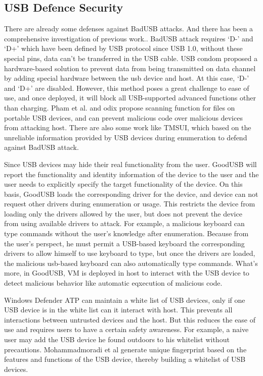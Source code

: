 \subsection{USB Defence Security}
There are already some defenses against BadUSB attacks. 
And there has been a comprehensive investigation of previous work.\cite{sok}.
BadUSB attack requires `D-' and `D+' which have been defined by USB protocol since USB 1.0\cite{usb10},
without these special pins, data can't be transferred in the USB cable. USB condom \cite{Condom} proposed a hardware-based solution to prevent data from being transmitted on data channel by adding special hardware between the usb device and host. At this case, `D-' and `D+' are disabled.
However, this method poses a great challenge to ease of use, and once deployed, it will block all USB-supported advanced functions other than charging. Pham et al. \cite{pham2010optimizing} and odix\cite{OLEA} propose scanning function for files on portable USB devices, and can prevent malicious code over malicious devices from attacking host.
There are also some work like TMSUI\cite{yang2015tmsui}, which based on the unreliable information provided by USB devices during enumeration to defend against BadUSB attack.

Since USB devices may hide their real functionality from the user. GoodUSB\cite{tian2015defending} will report the functionality and identity information of the device to the user and the user needs to explicitly specify the target functionality of the device. On this basis, GoodUSB loads the corresponding driver for the device, and device can not request other drivers during enumeration or usage. This restricts the device from loading only the drivers allowed by the user, but does not prevent the device from using available drivers to attack. For example, a malicious keyboard can type commands without the user's knowledge after enumeration. Because from the user's perspect, he must permit a USB-based keyboard the corresponding drivers to allow himself to use keyboard to type, but once the drivers are loaded, the malicious usb-based keyboard can also automatically type commands. What's more, in GoodUSB, VM is deployed in host to interact with the USB device to detect malicious behavior like automatic eqxecution of malicious code.
 
Windows Defender ATP\cite{windenfenderwhite} can maintain a white list of USB devices, only if one USB device is in the white list can it interact with host. This prevents all interactions between untrusted devices and the host. But this reduces the ease of use and requires users to have a certain safety awareness. For example, a naive user may add the USB device he found outdoors to his whitelist without precautions. Mohammadmoradi et al\cite{mohammadmoradi2018making} generate unique fingerprint based on the features and functions of the USB device, thereby building a whitelist of USB devices.

